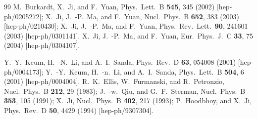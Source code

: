 \begin{thebibliography}{99}
  M.~Burkardt, X.~Ji, and F.~Yuan,
  Phys.\ Lett.\ B {\bf 545}, 345 (2002)
  [hep-ph/0205272];
  X.~Ji, J.~-P.~Ma, and F.~Yuan,
  Nucl.\ Phys.\ B {\bf 652}, 383 (2003)
  [hep-ph/0210430]; %
  X.~Ji, J.~-P.~Ma, and F.~Yuan,
  Phys.\ Rev.\ Lett.\  {\bf 90}, 241601 (2003)
  [hep-ph/0301141].
  X.~Ji, J.~-P.~Ma, and F.~Yuan,
  Eur.\ Phys.\ J.\ C {\bf 33}, 75 (2004)
  [hep-ph/0304107].

  Y.~Y.~Keum, H.~-N.~Li, and A.~I.~Sanda,
  Phys.\ Rev.\ D {\bf 63}, 054008 (2001)
  [hep-ph/0004173];
  Y.~-Y.~Keum, H.~-n.~Li, and A.~I.~Sanda,
  Phys.\ Lett.\ B {\bf 504}, 6 (2001)
  [hep-ph/0004004].
  R.~K.~Ellis, W.~Furmanski, and R.~Petronzio,
  Nucl.\ Phys.\ B {\bf 212}, 29 (1983);
  J.~-w.~Qiu, and G.~F.~Sterman,
  Nucl.\ Phys.\ B {\bf 353}, 105 (1991);
  X.~Ji,
  Nucl.\ Phys.\ B {\bf 402}, 217 (1993);
  P.~Hoodbhoy, and X.~Ji,
  Phys.\ Rev.\ D {\bf 50}, 4429 (1994)
  [hep-ph/9307304].


\end{thebibliography}
